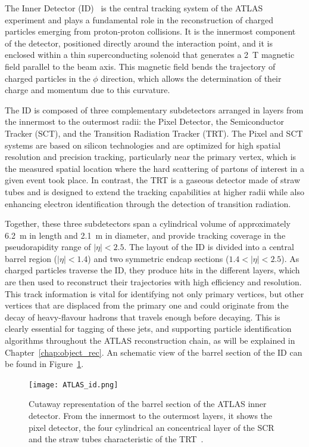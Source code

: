 The Inner Detector (ID)~\cite{id1,id2} is the central tracking system of the ATLAS experiment and plays a fundamental role in the reconstruction of charged particles emerging from proton-proton collisions. It is the innermost component of the detector, positioned directly around the interaction point, and it is enclosed within a thin superconducting solenoid that generates a 2~T magnetic field parallel to the beam axis. This magnetic field bends the trajectory of charged particles in the $\phi$ direction, which allows the determination of their charge and momentum due to this curvature.

The ID is composed of three complementary subdetectors arranged in layers from the innermost to the outermost radii: the Pixel Detector, the Semiconductor Tracker (SCT), and the Transition Radiation Tracker (TRT). The Pixel and SCT systems are based on silicon technologies and are optimized for high spatial resolution and precision tracking, particularly near the primary vertex, which is the measured spatial location where the hard scattering of partons of interest in a given event took place. In contrast, the TRT is a gaseous detector made of straw tubes and is designed to extend the tracking capabilities at higher radii while also enhancing electron identification through the detection of transition radiation.

Together, these three subdetectors span a cylindrical volume of approximately 6.2~m in length and 2.1~m in diameter, and provide tracking coverage in the pseudorapidity range of $|\eta| < 2.5$. The layout of the ID is divided into a central barrel region ($|\eta| < 1.4$) and two symmetric endcap sections ($1.4 < |\eta| < 2.5$). As charged particles traverse the ID, they produce hits in the different layers, which are then used to reconstruct their trajectories with high efficiency and resolution. This track information is vital for identifying not only primary vertices, but other vertices that are displaced from the primary one and could originate from the decay of heavy-flavour hadrons that travels enough before decaying. This is clearly essential for tagging of these jets, and supporting particle identification algorithms throughout the ATLAS reconstruction chain, as will be explained in Chapter~\ref{chap:object_rec}.
An schematic view of the barrel section of the ID can be found in Figure~\ref{fig:id}.
\begin{figure}[htbp]
    \centering
        \texttt{[image: ATLAS\_id.png]}
    \caption{Cutaway representation of the barrel section of the ATLAS inner detector. From the innermost to the outermost layers, it shows the pixel detector, the four cylindrical an concentrical layer of the SCR and the straw tubes characteristic of the TRT~\cite{Collaboration:2723878}.}
    \label{fig:id}
\end{figure}

